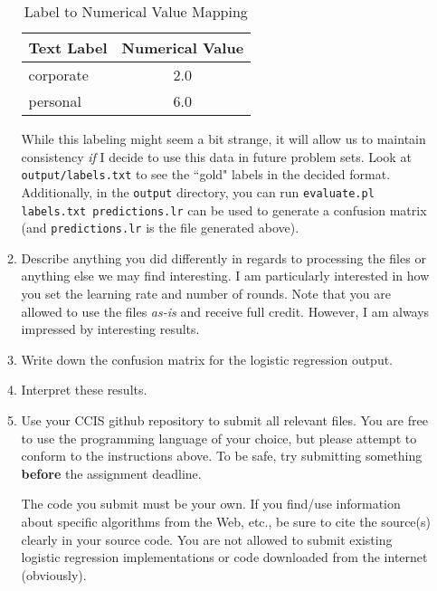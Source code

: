 \documentclass[12pt,letterpaper]{article}
\begin{document}
\begin{enumerate}
\begin{enumerate}
\begin{table}[htb]
\centering
\begin{tabular}{|l|c|}
\hline
Text Label & Numerical Value \\
\hline
corporate & 2.0 \\
personal & 6.0 \\
\hline
\end{tabular}
\caption{Label to Numerical Value Mapping}
\label{table:mapping}
\end{table}

While this labeling might seem a bit strange, it will allow us to maintain consistency {\em if} I decide to use this data in future problem sets.  Look at {\tt output/labels.txt} to see the ``gold" labels in the decided format.  Additionally, in the {\tt output} directory, you can run {\tt evaluate.pl labels.txt predictions.lr} can be used to generate a confusion matrix (and {\tt predictions.lr} is the file generated above). 

\item
Describe anything you did differently in regards to processing the files or anything else we may find interesting.  I am particularly interested in how you set the learning rate and number of rounds. Note that you are allowed to use the files {\em as-is} and receive full credit.  However, I am always impressed by interesting results.

\item
Write down the confusion matrix for the logistic regression output.

\item
Interpret these results.

\item
Use your CCIS github repository to submit all relevant files.  You are free to use the programming language of your choice, but please attempt to conform to the instructions above.  To be safe, try submitting something {\bf before} the assignment deadline.

The code you submit must be your own. If you find/use information about specific algorithms from the Web, etc., be sure to cite the source(s) clearly in your source code.  You are not allowed to submit existing logistic regression implementations or code downloaded from the internet (obviously).

\end{enumerate}

\end{enumerate}
\end{document}
